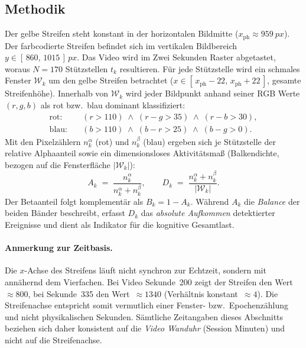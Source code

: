 \documentclass[11pt,a4paper]{article}
\begin{document}
\subsection{Methodik}\label{subsec:eeg-methodik}
Der gelbe Streifen steht konstant in der horizontalen Bildmitte
($x_{\text{ph}} \approx \SI{959}{px}$). Der farbcodierte Streifen befindet sich im
vertikalen Bildbereich $y \in [\,860,\,1015\,]\,\si{px}$. Das Video wird im
Zwei Sekunden Raster abgetastet, woraus $N = 170$ St\"utzstellen
$t_k$ resultieren. F\"ur jede St\"utzstelle wird ein schmales Fenster
$\mathcal{W}_k$ um den gelbe Streifen betrachtet
($x \in [\,x_{\text{ph}}-22,\,x_{\text{ph}}+22\,]$, gesamte Streifenh\"ohe).
Innerhalb von $\mathcal{W}_k$ wird jeder Bildpunkt anhand seiner RGB Werte
$(r,g,b)$ als rot  bzw.\ blau dominant klassifiziert:
%
\begin{align}
  \text{rot:}  \quad & (r > 110) \;\wedge\; (r-g > 35) \;\wedge\; (r-b > 30), \\
  \text{blau:} \quad & (b > 110) \;\wedge\; (b-r > 25) \;\wedge\; (b-g > 0).
\end{align}
%
Mit den Pixelz\"ahlern $n^{\alpha}_k$ (rot) und $n^{\beta}_k$ (blau) ergeben sich
je St\"utzstelle der relative Alphaanteil sowie ein dimensionsloses
Aktivit\"atsmaß (Balkendichte, bezogen auf die Fensterfl\"ache
$|\mathcal{W}_k|$):
%
\begin{equation}
  A_k \;=\; \frac{n^{\alpha}_k}{n^{\alpha}_k + n^{\beta}_k},
  \qquad
  D_k \;=\; \frac{n^{\alpha}_k + n^{\beta}_k}{|\mathcal{W}_k|}.
  \label{eq:alpha-activity}
\end{equation}
%
Der Betaanteil folgt komplement\"ar als $B_k = 1 - A_k$. W\"ahrend $A_k$ die
\emph{Balance} der beiden B\"ander beschreibt, erfasst $D_k$ das \emph{absolute
Aufkommen} detektierter Ereignisse und dient als Indikator f\"ur die kognitive
Gesamtlast.

\paragraph{Anmerkung zur Zeitbasis.}
Die $x$-Achse des Streifens l\"auft nicht synchron zur Echtzeit, sondern mit
ann\"ahernd dem Vierfachen. Bei Video Sekunde~\num{200} zeigt der Streifen den
Wert~$\approx\!\num{800}$, bei Sekunde~\num{335} den Wert~$\approx\!\num{1340}$
(Verh\"altnis konstant~$\approx\!4$). Die Streifenachse entspricht somit
vermutlich einer Fenster- bzw.\ Epochenz\"ahlung und nicht physikalischen Sekunden.
S\"amtliche Zeitangaben dieses Abschnitts beziehen sich daher konsistent auf die
\emph{Video Wanduhr} (Session Minuten) und nicht auf die Streifenachse.
\end{document}

